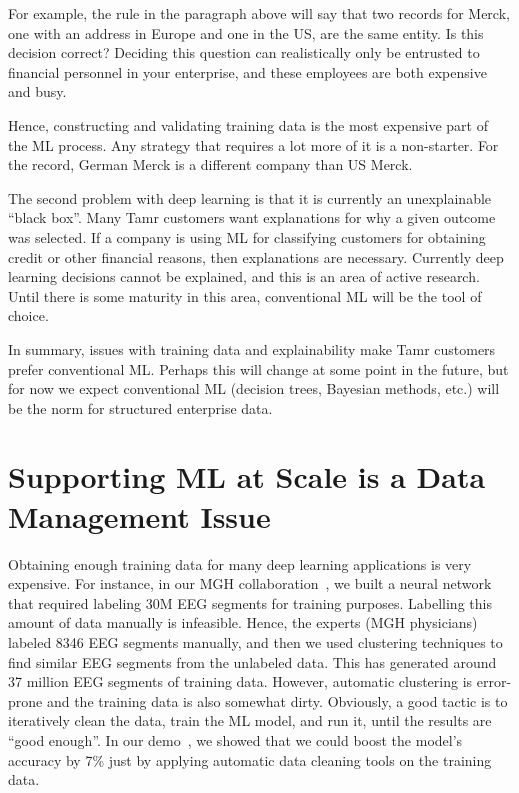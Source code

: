 \documentclass[11pt]{article}
\begin{document}
For example, the rule in the paragraph above will say that two records for Merck, one with an address in Europe and one in the US, are the same entity.  Is this decision correct?  Deciding this question can realistically only be entrusted to financial personnel in your enterprise, and these employees are both expensive and busy.  

Hence, constructing and validating training data is the most expensive part of the ML process.  Any strategy that requires a lot more of it is a non-starter.  For the record, German Merck is a different company than US Merck.

The second problem with deep learning is that it is currently an unexplainable “black box”.  Many Tamr customers want explanations for why a given outcome was selected.  If a company is using ML for classifying customers for obtaining credit or other financial reasons, then explanations are necessary.  Currently deep learning decisions cannot be explained, and this is an area of active research.  Until there is some maturity in this area, conventional ML will be the tool of choice.

In summary, issues with training data and explainability make Tamr customers prefer conventional ML.  Perhaps this will change at some point in the future, but for now we expect conventional ML (decision trees, Bayesian methods, etc.) will be the norm for structured enterprise data.

\section{Supporting ML at Scale is a Data Management Issue}
Obtaining enough training data for many deep learning applications is very expensive. For instance, in our MGH collaboration~\cite{6}, we built a neural network that required labeling 30M EEG segments for training purposes. Labelling this amount of data manually is infeasible.  Hence, the experts (MGH physicians) labeled 8346 EEG segments manually, and then we used clustering techniques to find similar EEG segments from the unlabeled data. This has generated around 37 million EEG segments of training data. However, automatic clustering is error-prone and the training data is also somewhat dirty. Obviously, a good tactic is to iteratively clean the data, train  the ML model, and run it, until the results are “good enough”.  In our demo~\cite{1}, we showed that we could boost the model’s accuracy by 7\% just by applying automatic data cleaning tools on the training data.
\end{document}
